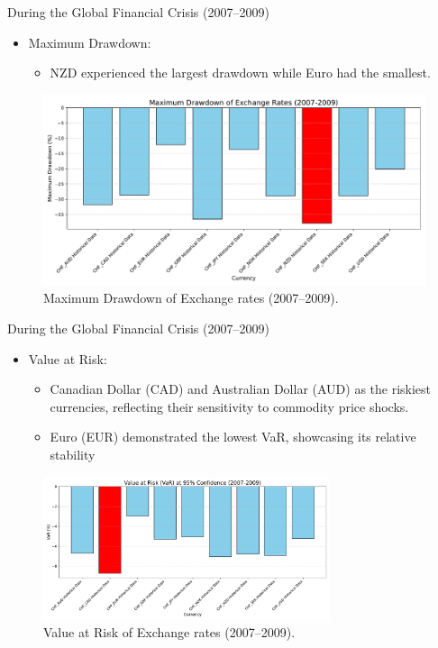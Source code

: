 \documentclass{beamer}
\begin{document}
\begin{frame}{During the Global Financial Crisis (2007--2009)}
  \begin{itemize}
    \item Maximum Drawdown:
    \begin{itemize}
      \item NZD experienced the largest drawdown while Euro had
the smallest.
    \end{itemize}
   \end{itemize}

    \begin{figure}
    \centering
        \includegraphics[width=0.75
        \textwidth]{../../images/maximum_drawdown_2007_2009.pdf}
        \caption{Maximum Drawdown of Exchange rates (2007--2009).}
        \label{fig:question}
    \end{figure}
    
\end{frame}

\begin{frame}{During the Global Financial Crisis (2007--2009)}
  \begin{itemize}
    \item Value at Risk:
    \begin{itemize}
      \item Canadian Dollar (CAD) and Australian Dollar (AUD) as the riskiest currencies, reflecting their sensitivity to commodity price shocks.
      \item Euro (EUR) demonstrated the lowest VaR, showcasing its relative stability
    \end{itemize}
   \end{itemize}

   \begin{figure}[h!]
    \centering
    \includegraphics[width=0.75\textwidth]{../../images/var_2007_2009.pdf}
    \caption{Value at Risk of Exchange rates (2007--2009).}
    \label{fig:var_2007_2009}
\end{figure}
    
\end{frame}
\end{document}
